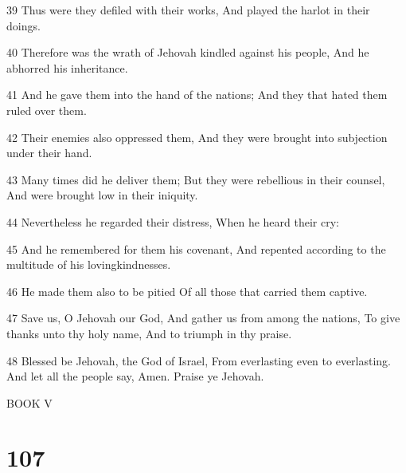 \par 39 Thus were they defiled with their works, And played the harlot in their doings.
\par 40 Therefore was the wrath of Jehovah kindled against his people, And he abhorred his inheritance.
\par 41 And he gave them into the hand of the nations; And they that hated them ruled over them.
\par 42 Their enemies also oppressed them, And they were brought into subjection under their hand.
\par 43 Many times did he deliver them; But they were rebellious in their counsel, And were brought low in their iniquity.
\par 44 Nevertheless he regarded their distress, When he heard their cry:
\par 45 And he remembered for them his covenant, And repented according to the multitude of his lovingkindnesses.
\par 46 He made them also to be pitied Of all those that carried them captive.
\par 47 Save us, O Jehovah our God, And gather us from among the nations, To give thanks unto thy holy name, And to triumph in thy praise.
\par 48 Blessed be Jehovah, the God of Israel, From everlasting even to everlasting. And let all the people say, Amen. Praise ye Jehovah.

\par BOOK V

\chapter{107}

